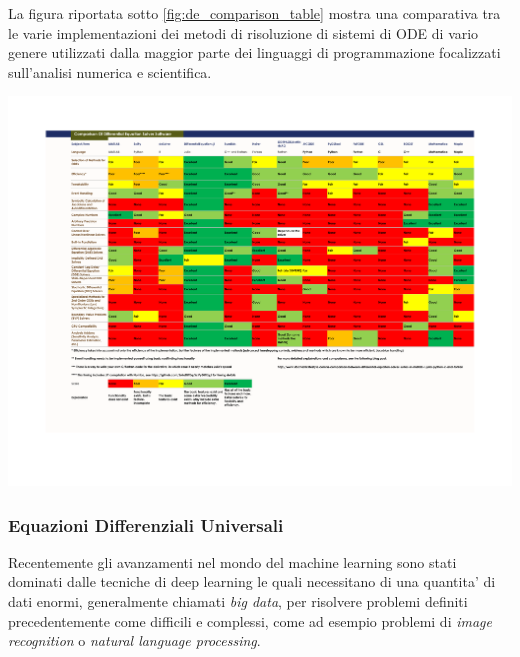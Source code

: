La figura riportata sotto \ref{fig:de_comparison_table} \cite{10.15200/winn.153459.98975} mostra una comparativa tra le varie implementazioni dei 
metodi di risoluzione di sistemi di ODE di vario genere utilizzati dalla maggior
parte dei linguaggi di programmazione focalizzati sull'analisi numerica e scientifica.

\begin{minipage}{\linewidth}
    \centering
    \includegraphics[width=\textwidth]{img/de_solver_software_comparsion.pdf}
    \label{fig:de_comparison_table}
\end{minipage}

\subsubsection*{Equazioni Differenziali Universali}
Recentemente gli avanzamenti nel mondo del machine learning sono stati dominati dalle tecniche 
di deep learning le quali necessitano di una quantita' di dati enormi, generalmente chiamati \emph{big data}, 
per risolvere problemi definiti precedentemente come difficili e complessi, come ad esempio problemi di 
\emph{image recognition} o \emph{natural language processing}. 

